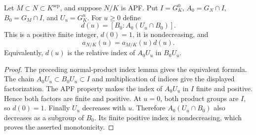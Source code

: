 \begin{lemma}
\label{fw:apf-nested-index-factor}
\leanok
Let $M\subset N\subset K^{\mathrm{sep}}$, and suppose $N/K$ is APF.
Put $I=G_K^0$, $A_0=G_N\cap I$, $B_0=G_M\cap I$, and $U_u=G_K^u$.
For $u\geq0$ define
\[
 d(u)=[B_0:A_0(U_u\cap B_0)].
\]
This is a positive finite integer, $d(0)=1$, it is nondecreasing, and
\[
 a_{N/K}(u)=a_{M/K}(u)d(u).
\]
Equivalently, $d(u)$ is the relative index of $A_0U_u$ in $B_0U_u$.
\end{lemma}
\begin{proof}
The preceding normal-product index lemma gives the equivalent formula.
The chain $A_0U_u\subset B_0U_u\subset I$ and multiplication of
indices give the displayed factorization. The APF property makes the
index of $A_0U_u$ in $I$ finite and positive. Hence both factors are
finite and positive. At $u=0$, both product groups are $I$, so $d(0)=1$.
Finally $U_u$ decreases with $u$. Therefore $A_0(U_u\cap B_0)$ also
decreases as a subgroup of $B_0$. Its finite positive index is
nondecreasing, which proves the asserted monotonicity.
\end{proof}

